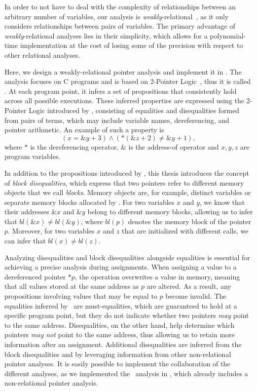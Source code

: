 In order to not have to deal with the complexity of relationships between an arbitrary number of variables, our analysis is \emph{weakly}-relational~\cite{octagon,SeidlETS2023}, as it only considers relationships between pairs of variables.
The primary advantage of \emph{weakly}-relational analyses lies in their simplicity, which allows for a polynomial-time implementation at the cost of losing some of the precision with respect to other relational analyses.

Here, we design a weakly-relational pointer analysis and implement it in \goblint.
The analysis focuses on C programs and is based on 2-Pointer Logic~\cite{2pointer}, thus it is called \cpo.
At each program point, it infers a set of propositions that consistently hold across all possible executions.
These inferred properties are expressed using the 2-Pointer Logic introduced by \textcite{2pointer},
consisting of equalities and disequalities formed from pairs of terms,
which may include variable names, dereferencing, and pointer arithmetic.
An example of such a property is
\begin{equation}\label{example:introduction}
    (x = \&y + 3) \land (*(\&z + 2) \neq \&y + 1),
\end{equation}
where $*$ is the dereferencing operator, $\&$ is the address-of operator and $x,y,z$ are program variables.

In addition to the propositions introduced by \textcite{2pointer}, this thesis introduces the concept of \emph{block disequalities},
which express that two pointers refer to different memory objects that we call \emph{blocks}.
Memory objects are, for example, distinct variables or separate memory blocks allocated by \malloc.
For two variables $x$ and $y$, we know that their addresses $\&x$ and $\&y$ belong to different memory blocks,
allowing us to infer that $bl(\&x) \neq bl(\&y)$, where $bl(p)$ denotes the memory block of the pointer $p$.
Moreover, for two variables $x$ and $z$ that are initialized with different \malloc calls,
we can infer that $bl(x) \neq bl(z)$.

Analyzing disequalities and block disequalities alongside equalities is essential for achieving a precise analysis during assignments.
When assigning a value to a dereferenced pointer $*p$,
the operation overwrites a value in memory, meaning that all values stored at the same address as
$p$ are altered.
As a result, any propositions involving values that may be equal to $p$ become invalid.
The equalities inferred by \cpo\ are must-equalities, which are guaranteed to hold at a specific program point, but they do not indicate whether two pointers \emph{may} point to the same address.
Disequalities, on the other hand, help determine which pointers \emph{may not} point to the same address,
thus allowing us to retain more information after an assignment.
Additional disequalities are inferred from the block disequalities and by
leveraging information from other non-relational pointer analyses.
It is easily possible to implement the collaboration of the different analyses, as we implemented the \cpo\ analysis in \goblint, which already includes a non-relational pointer analysis.

